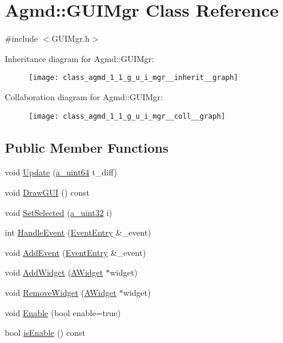 \hypertarget{class_agmd_1_1_g_u_i_mgr}{\section{Agmd\+:\+:G\+U\+I\+Mgr Class Reference}
\label{class_agmd_1_1_g_u_i_mgr}
}


{\ttfamily \#include $<$G\+U\+I\+Mgr.\+h$>$}



Inheritance diagram for Agmd\+:\+:G\+U\+I\+Mgr\+:\nopagebreak
\begin{figure}[H]
\begin{center}
\leavevmode
\texttt{[image: class\_agmd\_1\_1\_g\_u\_i\_mgr\_\_inherit\_\_graph]}
\end{center}
\end{figure}


Collaboration diagram for Agmd\+:\+:G\+U\+I\+Mgr\+:\nopagebreak
\begin{figure}[H]
\begin{center}
\leavevmode
\texttt{[image: class\_agmd\_1\_1\_g\_u\_i\_mgr\_\_coll\_\_graph]}
\end{center}
\end{figure}
\subsection*{Public Member Functions}
\begin{DoxyCompactItemize}
\item 
void \hyperlink{class_agmd_1_1_g_u_i_mgr_a7155d8cdeb88dd8019143ab6480a3c9e}{Update} (\hyperlink{_common_defines_8h_a6c5192ec3c55d6e5b13d2dbaa082bdea}{a\+\_\+uint64} t\+\_\+diff)
\item 
void \hyperlink{class_agmd_1_1_g_u_i_mgr_af0678a95b5444ad446ddb527ce2645c8}{Draw\+G\+U\+I} () const 
\item 
void \hyperlink{class_agmd_1_1_g_u_i_mgr_ab5bc5a47bf76bf79c199b1690819de7b}{Set\+Selected} (\hyperlink{_common_defines_8h_a964296f9770051b9e4807b1f180dd416}{a\+\_\+uint32} i)
\item 
int \hyperlink{class_agmd_1_1_g_u_i_mgr_a9b687a342289b7a6f8e876abe69bc776}{Handle\+Event} (\hyperlink{struct_agmd_1_1_event_entry}{Event\+Entry} \&\+\_\+event)
\item 
void \hyperlink{class_agmd_1_1_g_u_i_mgr_aa36edc13d8e792777de37b12b0899b6e}{Add\+Event} (\hyperlink{struct_agmd_1_1_event_entry}{Event\+Entry} \&\+\_\+event)
\item 
void \hyperlink{class_agmd_1_1_g_u_i_mgr_a68435e0b3145e490e272d05e1583857b}{Add\+Widget} (\hyperlink{class_agmd_1_1_a_widget}{A\+Widget} $\ast$widget)
\item 
void \hyperlink{class_agmd_1_1_g_u_i_mgr_a487f36882f13c6fb2265d1f19d3e15cd}{Remove\+Widget} (\hyperlink{class_agmd_1_1_a_widget}{A\+Widget} $\ast$widget)
\item 
void \hyperlink{class_agmd_1_1_g_u_i_mgr_af61a60154925c3b07d65b313aaab1f1f}{Enable} (bool enable=true)
\item 
bool \hyperlink{class_agmd_1_1_g_u_i_mgr_aaa2e2b110abc392aa30d7728376326f6}{is\+Enable} () const 
\end{DoxyCompactItemize}
